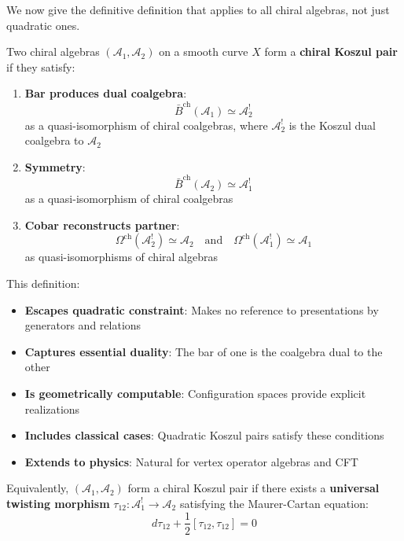 \begin{example}
We now give the definitive definition that applies to all chiral algebras, not just 
quadratic ones.

\begin{definition}
\label{def:chiral-koszul-pair-bar-cobar}
Two chiral algebras $(\mathcal{A}_1, \mathcal{A}_2)$ on a smooth curve $X$ form a 
\textbf{chiral Koszul pair} if they satisfy:

\begin{enumerate}
\item \textbf{Bar produces dual coalgebra}:
      $$\bar{B}^{\text{ch}}(\mathcal{A}_1) \simeq \mathcal{A}_2^!$$
      as a quasi-isomorphism of chiral coalgebras, where $\mathcal{A}_2^!$ is the 
      Koszul dual coalgebra to $\mathcal{A}_2$

\item \textbf{Symmetry}:
      $$\bar{B}^{\text{ch}}(\mathcal{A}_2) \simeq \mathcal{A}_1^!$$
      as a quasi-isomorphism of chiral coalgebras

\item \textbf{Cobar reconstructs partner}:
      $$\Omega^{\text{ch}}(\mathcal{A}_2^!) \simeq \mathcal{A}_2 \quad \text{and} \quad 
        \Omega^{\text{ch}}(\mathcal{A}_1^!) \simeq \mathcal{A}_1$$
      as quasi-isomorphisms of chiral algebras
\end{enumerate}
\end{definition}

\begin{remark}
\label{rem:why-definition-works}
This definition:
\begin{itemize}
\item \textbf{Escapes quadratic constraint}: Makes no reference to presentations by 
      generators and relations
\item \textbf{Captures essential duality}: The bar of one is the coalgebra dual to the other
\item \textbf{Is geometrically computable}: Configuration spaces provide explicit realizations
\item \textbf{Includes classical cases}: Quadratic Koszul pairs satisfy these conditions
\item \textbf{Extends to physics}: Natural for vertex operator algebras and CFT
\end{itemize}
\end{remark}

\begin{definition}
\label{def:chiral-koszul-pair-twisting}
Equivalently, $(\mathcal{A}_1, \mathcal{A}_2)$ form a chiral Koszul pair if there exists 
a \textbf{universal twisting morphism} $\tau_{12}: \mathcal{A}_1^! \to \mathcal{A}_2$ 
satisfying the Maurer-Cartan equation:
$$d\tau_{12} + \frac{1}{2}[\tau_{12}, \tau_{12}] = 0$$


\end{definition}
\end{example}
